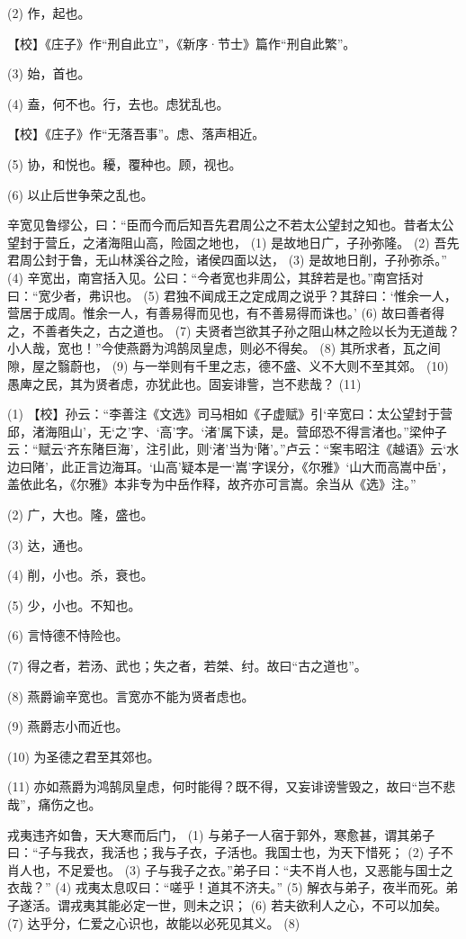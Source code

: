 \documentclass[12pt,UTF8]{ctexbook}
\begin{document}
(2) 作，起也。

【校】《庄子》作“刑自此立”，《新序·节士》篇作“刑自此繁”。

(3) 始，首也。

(4) 盍，何不也。行，去也。虑犹乱也。

【校】《庄子》作“无落吾事”。虑、落声相近。

(5) 协，和悦也。耰，覆种也。顾，视也。

(6) 以止后世争荣之乱也。

辛宽见鲁缪公，曰：“臣而今而后知吾先君周公之不若太公望封之知也。昔者太公望封于营丘，之渚海阻山高，险固之地也， (1) 是故地日广，子孙弥隆。 (2) 吾先君周公封于鲁，无山林溪谷之险，诸侯四面以达， (3) 是故地日削，子孙弥杀。” (4) 辛宽出，南宫括入见。公曰：“今者宽也非周公，其辞若是也。”南宫括对曰：“宽少者，弗识也。 (5) 君独不闻成王之定成周之说乎？其辞曰：‘惟余一人，营居于成周。惟余一人，有善易得而见也，有不善易得而诛也。’ (6) 故曰善者得之，不善者失之，古之道也。 (7) 夫贤者岂欲其子孙之阻山林之险以长为无道哉？小人哉，宽也！”今使燕爵为鸿鹄凤皇虑，则必不得矣。 (8) 其所求者，瓦之间隙，屋之翳蔚也， (9) 与一举则有千里之志，德不盛、义不大则不至其郊。 (10) 愚庳之民，其为贤者虑，亦犹此也。固妄诽訾，岂不悲哉？ (11)

(1) 【校】孙云：“李善注《文选》司马相如《子虚赋》引‘辛宽曰：太公望封于营邱，渚海阻山’，无‘之’字、‘高’字。‘渚’属下读，是。营邱恐不得言渚也。”梁仲子云：“赋云‘齐东陼巨海’，注引此，则‘渚’当为‘陼’。”卢云：“案韦昭注《越语》云‘水边曰陼’，此正言边海耳。‘山高’疑本是一‘嵩’字误分，《尔雅》‘山大而高嵩中岳’，盖依此名，《尔雅》本非专为中岳作释，故齐亦可言嵩。余当从《选》注。”

(2) 广，大也。隆，盛也。

(3) 达，通也。

(4) 削，小也。杀，衰也。

(5) 少，小也。不知也。

(6) 言恃德不恃险也。

(7) 得之者，若汤、武也；失之者，若桀、纣。故曰“古之道也”。

(8) 燕爵谕辛宽也。言宽亦不能为贤者虑也。

(9) 燕爵志小而近也。

(10) 为圣德之君至其郊也。

(11) 亦如燕爵为鸿鹄凤皇虑，何时能得？既不得，又妄诽谤訾毁之，故曰“岂不悲哉”，痛伤之也。

戎夷违齐如鲁，天大寒而后门， (1) 与弟子一人宿于郭外，寒愈甚，谓其弟子曰：“子与我衣，我活也；我与子衣，子活也。我国士也，为天下惜死； (2) 子不肖人也，不足爱也。 (3) 子与我子之衣。”弟子曰：“夫不肖人也，又恶能与国士之衣哉？” (4) 戎夷太息叹曰：“嗟乎！道其不济夫。” (5) 解衣与弟子，夜半而死。弟子遂活。谓戎夷其能必定一世，则未之识； (6) 若夫欲利人之心，不可以加矣。 (7) 达乎分，仁爱之心识也，故能以必死见其义。 (8)
\end{document}
